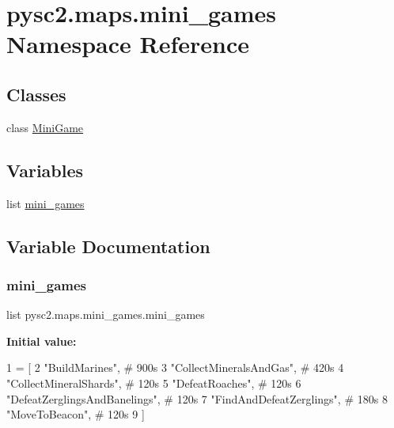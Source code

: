 \hypertarget{namespacepysc2_1_1maps_1_1mini__games}{}\section{pysc2.\+maps.\+mini\+\_\+games Namespace Reference}
\label{namespacepysc2_1_1maps_1_1mini__games}
\subsection*{Classes}
\begin{DoxyCompactItemize}
\item 
class \mbox{\hyperlink{classpysc2_1_1maps_1_1mini__games_1_1_mini_game}{Mini\+Game}}
\end{DoxyCompactItemize}
\subsection*{Variables}
\begin{DoxyCompactItemize}
\item 
list \mbox{\hyperlink{namespacepysc2_1_1maps_1_1mini__games_a28f8f5f6a0c66560571e208cd6fdae9d}{mini\+\_\+games}}
\end{DoxyCompactItemize}


\subsection{Variable Documentation}
\mbox{\label{namespacepysc2_1_1maps_1_1mini__games_a28f8f5f6a0c66560571e208cd6fdae9d}} 
\subsubsection{\texorpdfstring{mini\+\_\+games}{mini\_games}}
{\footnotesize\ttfamily list pysc2.\+maps.\+mini\+\_\+games.\+mini\+\_\+games}

{\bfseries Initial value\+:}
\begin{DoxyCode}
1 =  [
2     \textcolor{stringliteral}{"BuildMarines"},  \textcolor{comment}{# 900s}
3     \textcolor{stringliteral}{"CollectMineralsAndGas"},  \textcolor{comment}{# 420s}
4     \textcolor{stringliteral}{"CollectMineralShards"},  \textcolor{comment}{# 120s}
5     \textcolor{stringliteral}{"DefeatRoaches"},  \textcolor{comment}{# 120s}
6     \textcolor{stringliteral}{"DefeatZerglingsAndBanelings"},  \textcolor{comment}{# 120s}
7     \textcolor{stringliteral}{"FindAndDefeatZerglings"},  \textcolor{comment}{# 180s}
8     \textcolor{stringliteral}{"MoveToBeacon"},  \textcolor{comment}{# 120s}
9 ]
\end{DoxyCode}
